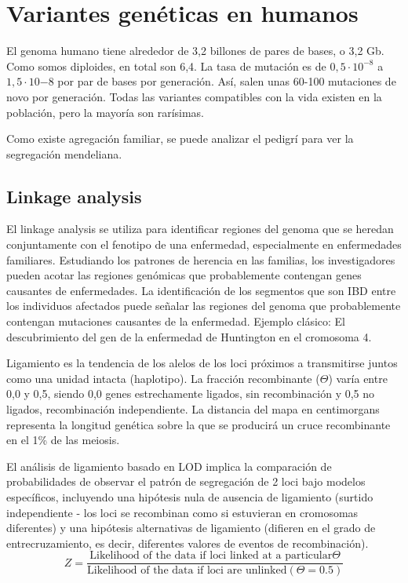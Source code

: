 \section{Variantes genéticas en humanos}
El genoma humano tiene alrededor de 3,2 billones de pares de bases, o 3,2 Gb. Como somos diploides, en total son 6,4. La tasa de mutación es de $0,5 \cdot 10^{-8}$ a $1,5 \cdot 10{-8}$ por par de bases por generación. Así, salen unas 60-100 mutaciones de novo por generación. Todas las variantes compatibles con la vida existen en la población, pero la mayoría son rarísimas.

Como existe agregación familiar, se puede analizar el pedigrí para ver la segregación mendeliana.

\subsection{Linkage analysis}
El linkage analysis se utiliza para identificar regiones del genoma que se heredan conjuntamente con el fenotipo de una enfermedad, especialmente en enfermedades familiares. Estudiando los patrones de herencia en las familias, los investigadores pueden acotar las regiones genómicas que probablemente contengan genes causantes de enfermedades. La identificación de los segmentos que son IBD entre los individuos afectados puede señalar las regiones del genoma que probablemente contengan mutaciones causantes de la enfermedad. Ejemplo clásico: El descubrimiento del gen de la enfermedad de Huntington en el cromosoma 4.

Ligamiento es la tendencia de los alelos de los loci próximos a transmitirse juntos como una unidad intacta (haplotipo). La fracción recombinante ($\Theta$) varía entre 0,0 y 0,5, siendo 0,0 genes estrechamente ligados, sin recombinación y 0,5 no ligados, recombinación independiente. La distancia del mapa en centimorgans representa la longitud genética sobre la que se producirá un cruce recombinante en el 1\% de las meiosis.

El análisis de ligamiento basado en LOD implica la comparación de probabilidades de observar el patrón de segregación de 2 loci bajo modelos específicos, incluyendo una hipótesis nula de ausencia de ligamiento (surtido independiente - los loci se recombinan como si estuvieran en cromosomas diferentes) y una hipótesis alternativas de ligamiento (difieren en el grado de entrecruzamiento, es decir, diferentes valores de eventos de recombinación).
$$Z = \frac{\text{Likelihood of the data if loci linked at a particular} \Theta}{\text{Likelihood of the data if loci are unlinked} (\Theta = 0.5)}$$

